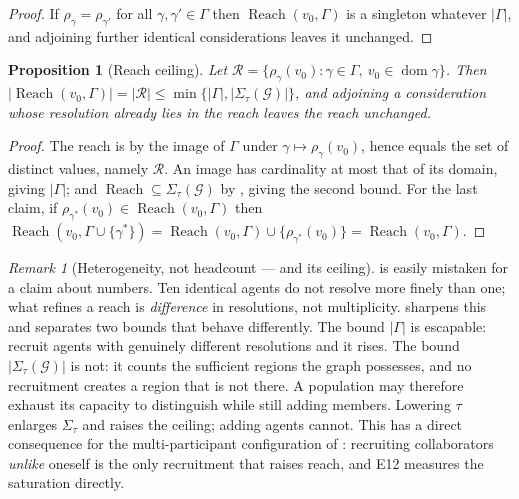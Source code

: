 \documentclass[11pt,a4paper]{article}
\theoremstyle{clstyle}
\newtheorem{proposition}[theorem]{Proposition}
\theoremstyle{definition}
\theoremstyle{remark}
\newtheorem{remark}[theorem]{Remark}
\DeclareMathOperator{\Reach}{Reach}
\DeclareMathOperator{\dom}{dom}
\newcommand{\Gph}{\mathcal{G}}
\newcommand{\Sig}{\Sigma}
\newcommand{\abs}[1]{\lvert#1\rvert}
\begin{document}
\begin{proof}
If $\rho_\gamma=\rho_{\gamma'}$ for all $\gamma,\gamma'\in\Gamma$ then
$\Reach(v_0,\Gamma)$ is a singleton whatever $\abs{\Gamma}$, and adjoining
further identical considerations leaves it unchanged.
\end{proof}

\begin{proposition}[Reach ceiling]
\label{prop:ceiling}
Let $\mathcal{R}=\{\rho_\gamma(v_0):\gamma\in\Gamma,\ v_0\in\dom\gamma\}$.
Then
$\abs{\Reach(v_0,\Gamma)}=\abs{\mathcal{R}}
\le\min\{\abs{\Gamma},\abs{\Sig_\tau(\Gph)}\}$,
and adjoining a consideration whose resolution already lies in the reach
leaves the reach unchanged.
\end{proposition}

\begin{proof}
The reach is by  the image of $\Gamma$ under
$\gamma\mapsto\rho_\gamma(v_0)$, hence equals the set of distinct values,
namely $\mathcal{R}$. An image has cardinality at most that of its domain,
giving $\abs{\Gamma}$; and $\Reach\subseteq\Sig_\tau(\Gph)$ by
, giving the second bound. For the last claim, if
$\rho_{\gamma^*}(v_0)\in\Reach(v_0,\Gamma)$ then
$\Reach(v_0,\Gamma\cup\{\gamma^*\})=\Reach(v_0,\Gamma)\cup
\{\rho_{\gamma^*}(v_0)\}=\Reach(v_0,\Gamma)$.
\end{proof}

\begin{remark}[Heterogeneity, not headcount --- and its ceiling]
\label{rem:heterogeneity}
 is easily mistaken for a claim about numbers. Ten
identical agents do not resolve more finely than one; what refines a reach is
\emph{difference} in resolutions, not multiplicity. 
sharpens this and separates two bounds that behave differently. The bound
$\abs{\Gamma}$ is escapable: recruit agents with genuinely different
resolutions and it rises. The bound $\abs{\Sig_\tau(\Gph)}$ is not: it counts
the sufficient regions the graph possesses, and no recruitment creates a
region that is not there. A population may therefore exhaust its capacity to
distinguish while still adding members. Lowering $\tau$ enlarges
$\Sig_\tau$ and raises the ceiling; adding agents cannot. This has a direct
consequence for the multi-participant configuration of :
recruiting collaborators \emph{unlike} oneself is the only recruitment that
raises reach, and E12 measures the saturation directly.
\end{remark}
\end{document}
